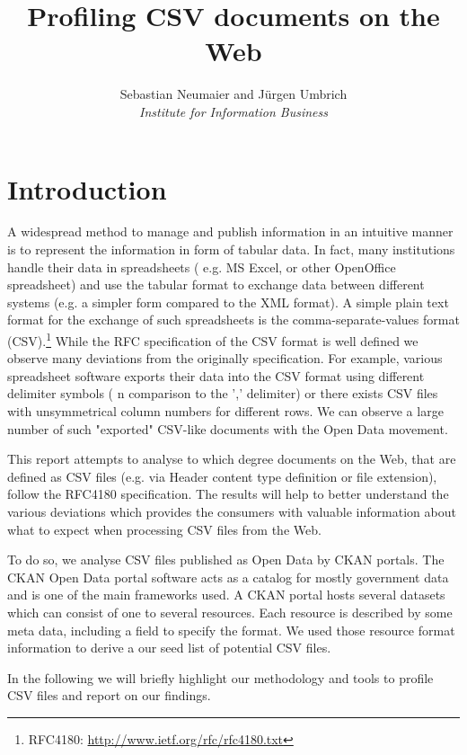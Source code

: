 \documentclass{scrartcl}
\title{Profiling CSV documents on the Web}
\subtitle{}
\author{Sebastian Neumaier and J\"urgen Umbrich \\\emph{Institute for
Information Business}}
\date{}
\begin{document}
\maketitle
\tableofcontents
\section{Introduction}
A widespread method to manage and publish information in an intuitive manner is to represent the information in form of tabular data.
In fact, many institutions handle their data in spreadsheets ( e.g. MS Excel, or other OpenOffice spreadsheet) and use the tabular format to exchange data between different systems (e.g. a simpler form compared to the XML format).
A simple plain text format for the exchange of such spreadsheets is the comma-separate-values format (CSV).\footnote{RFC4180: \url{http://www.ietf.org/rfc/rfc4180.txt}} 
While the RFC specification of the CSV format is well defined
we observe many deviations from the originally specification. 
For example, various spreadsheet software exports their data into the CSV format using different delimiter symbols ( n comparison to the ',' delimiter) or there exists CSV files with unsymmetrical column numbers for different rows. 
We can observe a large number of such "exported" CSV-like documents with the Open Data movement. 

This report attempts to analyse to which degree documents on the Web, that are defined as CSV files (e.g. via Header content type definition or file extension), follow the RFC4180 specification.
The results will help to better understand the various deviations which provides the consumers with valuable information about what to expect when processing CSV files from the Web. 


To do so, we analyse CSV files published as Open Data by CKAN portals. 
The CKAN Open Data portal software acts as a catalog for mostly government data and is one of the main frameworks used. 
A CKAN portal hosts several datasets which can consist of one to several resources. Each resource is described by some meta data, including a field to specify the format. 
We used those resource format information to derive a our seed list of potential CSV files. 

In the following we will briefly highlight our methodology and tools to profile CSV files and report on our findings. 
\end{document}
